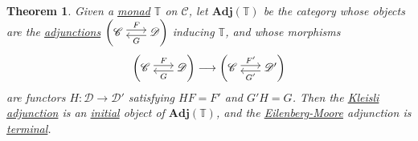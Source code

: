 \documentclass{article}
\newenvironment{tikzcdi}{\begin{tikzcd}[cramped, sep=scriptsize]}{\end{tikzcd}}
\let\to\longrightarrow
\newtheorem{nthm}{Theorem}[section]
\begin{document}
\begin{nthm}\label{thm:5.7}
  Given a \hyperlink{def:monad}{monad} $\mathbb{T}$ on $\mathscr{C}$, let $\mathbf{Adj}(\mathbb{T})$ be the category whose objects are the \hyperlink{def:adj}{adjunctions}
  $\left(\begin{tikzcdi}\mathscr{C} \rar[shift left]{F} & \mathscr{D} \lar[shift left]{G}\end{tikzcdi}\right)$
  inducing $\mathbb{T}$, and whose morphisms
  \begin{equation*}\left(\begin{tikzcdi}\mathscr{C} \rar[shift left]{F} & \mathscr{D} \lar[shift left]{G}\end{tikzcdi}\right)\to \left(\begin{tikzcdi}\mathscr{C} \rar[shift left]{F'} & \mathscr{D}' \lar[shift left]{G'}\end{tikzcdi}\right)\end{equation*}
  are functors $H: \mathscr{D} \to \mathscr{D}'$ satisfying $HF = F'$ and $G'H = G$.
  Then the \hyperlink{def:kleisli}{Kleisli} \hyperlink{def:adj}{adjunction} is an \hyperlink{def:initial}{initial} object of $\mathbf{Adj}(\mathbb{T})$, and the \hyperlink{def:em}{Eilenberg-Moore} adjunction is \hyperlink{def:terminal}{terminal}.
\end{nthm}
\end{document}
